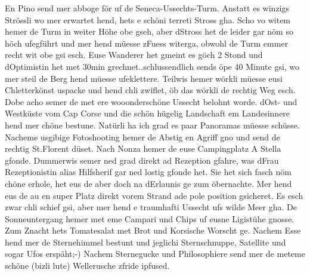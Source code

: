 En Pino send mer abboge för uf de Seneca-Ussechts-Turm.
Anstatt es winzigs Strössli wo mer erwartet hend, hets e schöni terreti Stross gha.
Scho vo witem hemer de Turm in weiter Höhe obe gseh, aber dStross het de leider gar nöm so höch ufegführt und mer hend müesse zFuess witerga, obwohl de Turm emmer recht wit obe gsi esch.
Euse Wanderer het gmeint es göch 2 Stond und dOptimistin het met 30min grechnet..schlussendlich sends öpe 40 Minute gsi, wo mer steil de Berg hend müesse ufeklettere.
Teilwis hemer wörkli müesse eusi Chletterkönst uspacke und hend chli zwiflet, öb das wörkli de rechtig Weg esch.
Dobe acho semer de met ere wooonderschöne Ussecht belohnt worde.
dOst- und Westküste vom Cap Corse und die schön hügelig Landschaft em Landesinnere hend mer chöne bestune.
Natürli ha ich grad es paar Panoramas müesse schüsse.
Nacheme usgibige Fotoshooting hemer de Abstig en Agriff gno und send de rechtig St.Florent düset.
Nach Nonza hemer de euse Campingplatz A Stella gfonde.
Dummerwis semer ned grad direkt ad Rezeption gfahre, was dFrau Rezeptionistin alias Hilfsherif gar ned lostig gfonde het.
Sie het sich fasch nöm chöne erhole, het eus de aber doch na dErlaunis ge zum öbernachte.
Mer hend eus de au en super Platz direkt vorem Strand ade pole position gsicheret.
Es esch zwar chli schief gsi, aber mer hend e traumhafti Ussecht ufs wilde Meer gha.
De Sonneuntergang hemer met eme Campari und Chips uf eusne Ligistühe gnosse.
Zum Znacht hets Tomatesalat met Brot und Korsische Worscht ge.
Nachem Esse hend mer de Sternehimmel bestunt und jeglichi Sternschnuppe, Satellite und sogar Ufos erspäht;-) Nachem Sternegucke und Philosophiere send mer de meteme schöne (bizli lute) Wellerusche zfride ipfused.

